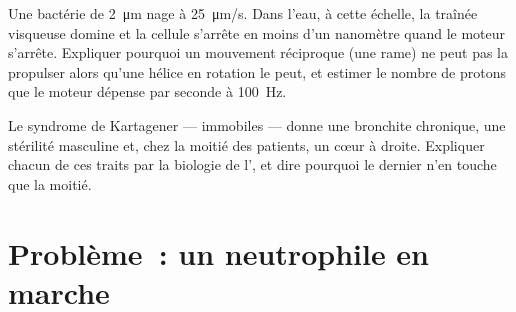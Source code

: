 \begin{exercise}[$\star\star\star$]\label{exo:b3:cytoskeleton-motility:11}
Une bactérie de \qty{2}{\micro m} nage à \qty{25}{\micro m/s}. Dans
l'eau, à cette échelle, la traînée visqueuse domine et la cellule
s'arrête en moins d'un nanomètre quand le moteur s'arrête. Expliquer
pourquoi un mouvement réciproque (une rame) ne peut pas la propulser
alors qu'une hélice en rotation le peut, et estimer le nombre de
protons que le moteur dépense par seconde à \qty{100}{Hz}.
\end{exercise}

\begin{exercise}[$\star\star\star$]\label{exo:b3:cytoskeleton-motility:12}
Le syndrome de Kartagener ---  immobiles --- donne une bronchite
chronique, une stérilité masculine et, chez la moitié des patients, un
cœur à droite. Expliquer chacun de ces traits par la biologie de
l', et dire pourquoi le dernier n'en touche que la moitié.
\end{exercise}

\section{Problème~: un neutrophile en marche}

